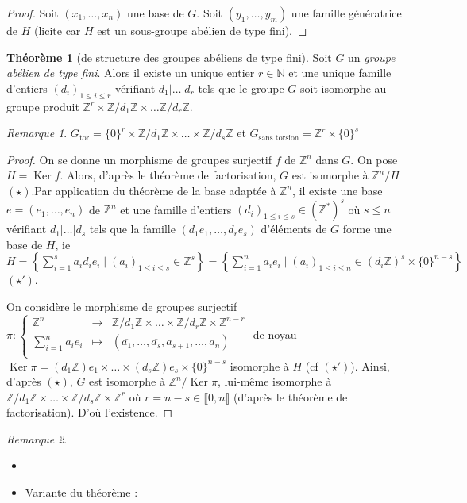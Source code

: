 \documentclass{article}
\newcommand{\Z}{\mathbb{Z}}
\newcommand{\N}{\mathbb{N}}
\renewcommand{\ker}{\mathop{\mathrm{Ker}}\nolimits}
\newcommand{\Gt}{G_{\mathrm{tor}}}
\newcommand{\dis}{\displaystyle}
\newcommand{\nt}[1]{\llbracket  #1 \rrbracket }
\theoremstyle{definition}
\newtheorem{theo}[defi]{Théorème}
\theoremstyle{remark}
\newtheorem{rem}{Remarque}
\newcommand{\app}[5]{#1:\left\{\begin{array}{rcl}
#2 & \longrightarrow & #3 \\
#4 & \longmapsto & #5  \\
\end{array}\right.
}
\begin{document}
\begin{proof}
Soit $(x_1, \ldots, x_n)$ une base de $G$. Soit $(y_1, \ldots, y_m)$ une famille génératrice de $H$ (licite car $H$ est un sous-groupe abélien de type fini). 
\end{proof}

\begin{theo}[de structure des groupes abéliens de type fini]
Soit $G$ un \textit{groupe abélien de type fini}. Alors il existe un unique entier $r \in \N$ et une unique famille d'entiers $(d_i)_{1 \leqslant i \leqslant r}$ vérifiant $d_1 \vert \ldots \vert d_r$ tels que le groupe $G$ soit isomorphe au groupe produit $\Z^r \times \Z/d_1\Z \times \ldots \Z/d_r\Z$. 
\end{theo}

\begin{rem}
$\Gt=\{0\}^r \times \Z/d_1\Z \times \ldots \times \Z/d_s\Z$ et $G_{\textrm{sans torsion}}=\Z^r \times \{0\}^{s}$ 
\end{rem}

\begin{proof}
On se donne un morphisme de groupes surjectif $f$ de $\Z^n$ dans $G$. On pose $H=\ker f$. Alors, d'après le théorème de factorisation, $G$ est isomorphe à $\Z^n/H$ $(\star)$.Par application du théorème de la base adaptée à $\Z^n$, il existe une base $e=(e_1, \ldots, e_n)$ de $\Z^n$ et une famille d'entiers $(d_i)_{1 \leqslant i \leqslant s} \in (\Z^*)^s$ où $s \leqslant n$ vérifiant $d_1 \vert \ldots \vert d_s$ tels que la famille $(d_1e_1, \ldots, d_re_s)$ d'éléments de $G$ forme une base de $H$, ie $H=\left\{\dis \sum_{i=1}^s a_id_ie_i \mid (a_i)_{1 \leqslant i \leqslant s} \in \Z^s \right\}=\left\{\dis \sum_{i=1}^n a_ie_i \mid (a_i)_{1 \leqslant i \leqslant n} \in (d_i\Z)^s\times\{0\}^{n-s} \right\}$ $(\star ')$. 

On considère le morphisme de groupes surjectif $\app{\pi}{\Z^n}{\Z/d_1\Z \times \ldots \times \Z/d_r\Z \times \Z^{n-r}}{\dis \sum_{i=1}^na_ie_i}{(\overline{a_1}, \ldots, \overline{a_s},a_{s+1}, \ldots, a_n)}$ de noyau $\ker \pi=(d_1\Z )e_1 \times \ldots \times (d_s\Z)e_s \times \{0\}^{n-s}$ isomorphe à $H$ (cf $(\star ')$). 
Ainsi, d'après $(\star)$, $G$ est isomorphe à $\Z^n/\ker \pi$, lui-même isomorphe à $\Z/d_1\Z \times \ldots \times \Z/d_s\Z \times \Z^{r}$ où $r=n-s \in \nt{0,n}$ (d'après le théorème de factorisation). D'où l'existence. 
\end{proof}

\begin{rem}
\begin{itemize}
\item  
\item Variante du théorème :
\end{itemize}
\end{rem}
\end{document}
